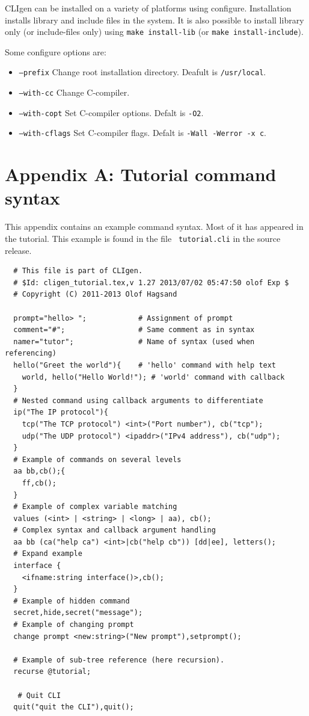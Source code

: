\documentclass[a4paper, 10pt] {article}
\begin{document}
CLIgen can be installed on a variety of platforms using
configure. Installation installs library and include files in the
system. It is also possible to install library only (or include-files
only) using {\tt make install-lib} (or {\tt make install-include}).

\normalsize
Some configure options are:
\begin{itemize}
\item {\tt --prefix} Change root installation directory. Deafult is {\tt /usr/local}.
\item {\tt --with-cc} Change C-compiler. 
\item {\tt --with-copt} Set C-compiler options. Defalt is {\tt -O2}.
\item {\tt --with-cflags} Set C-compiler flags. Defalt is {\tt -Wall -Werror -x c}.
\end{itemize}


\newpage
\section*{Appendix A: Tutorial command syntax}
\label{app:syntax}

This appendix contains an example command syntax. Most of it has
appeared in the tutorial. This example is found in the file {\tt
  tutorial.cli} in the source release.

\small
\begin{verbatim}
  # This file is part of CLIgen.
  # $Id: cligen_tutorial.tex,v 1.27 2013/07/02 05:47:50 olof Exp $
  # Copyright (C) 2011-2013 Olof Hagsand

  prompt="hello> ";            # Assignment of prompt
  comment="#";                 # Same comment as in syntax
  namer="tutor";               # Name of syntax (used when referencing)
  hello("Greet the world"){    # 'hello' command with help text
    world, hello("Hello World!"); # 'world' command with callback
  }
  # Nested command using callback arguments to differentiate
  ip("The IP protocol"){       
    tcp("The TCP protocol") <int>("Port number"), cb("tcp");
    udp("The UDP protocol") <ipaddr>("IPv4 address"), cb("udp");
  }
  # Example of commands on several levels
  aa bb,cb();{              
    ff,cb();
  }
  # Example of complex variable matching
  values (<int> | <string> | <long> | aa), cb();
  # Complex syntax and callback argument handling
  aa bb (ca("help ca") <int>|cb("help cb")) [dd|ee], letters();
  # Expand example
  interface {
    <ifname:string interface()>,cb(); 
  }
  # Example of hidden command
  secret,hide,secret("message");        
  # Example of changing prompt
  change prompt <new:string>("New prompt"),setprompt(); 
  
  # Example of sub-tree reference (here recursion).
  recurse @tutorial;

   # Quit CLI
  quit("quit the CLI"),quit(); 
\end{verbatim}
\normalsize
\end{document}
